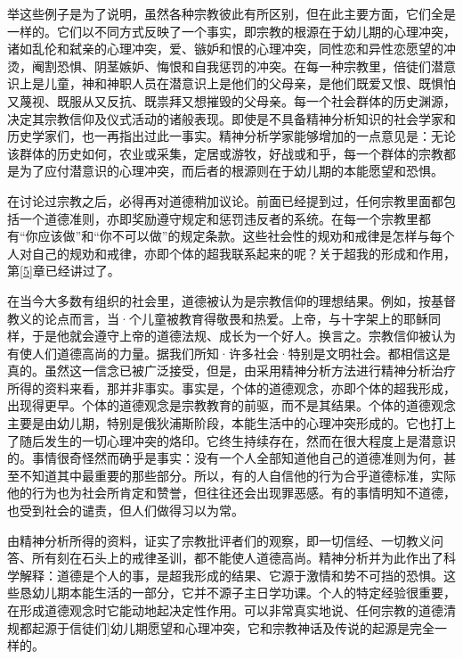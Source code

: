 \documentclass[UTF8,10pt,a4paper,openany]{book}
\begin{document}
举这些例子是为了说明，虽然各种宗教彼此有所区别，但在此主要方面，它们全是一样的。它们以不同方式反映了一个事实，即宗教的根源在于幼儿期的心理冲突，诸如乱伦和弑亲的心理冲突，爱、镞妒和恨的心理冲突，同性恋和异性恋愿望的冲烫，阉割恐惧、阴茎嫉妒、悔恨和自我惩罚的冲突。在每一种宗教里，倍徒们潜意识上是儿童，神和神职人员在潜意识上是他们的父母亲，是他们既爱又恨、既惧怕又蔑视、既服从又反抗、既祟拜又想摧毁的父母亲。每一个社会群体的历史渊源，决定其宗教信仰及仪式活动的诸般表现。即使是不具备精神分析知识的社会学家和历史学家们，也一再指出过此一事实。精神分析学家能够增加的一点意见是：无论该群体的历史如何，农业或采集，定居或游牧，好战或和乎，每一个群体的宗教都是为了应付潜意识的心理冲突，而后者的根源则在于幼儿期的本能愿望和恐惧。

在讨论过宗教之后，必得再对道德稍加议论。前面已经提到过，任何宗教里面都包括一个道德准则，亦即奖励遵守规定和惩罚违反者的系统。在每一个宗教里都有“你应该做”和“你不可以做”的规定条款。这些社会性的规劝和戒律是怎样与每个人对自己的规劝和戒律，亦即个体的超我联系起来的呢？关于超我的形成和作用，第\ref{5}章已经讲过了。

在当今大多数有组织的社会里，道德被认为是宗教信仰的理想结果。例如，按基督教义的论点而言，当·个儿童被教育得敬畏和热爱。上帝，与十字架上的耶稣同样，于是他就会遵守上帝的道德法规、成长为一个好人。换言之。宗教信仰被认为有使人们道德高尚的力量。据我们所知·许多社会·特别是文明社会。都相信这是真的。虽然这一信念已被广泛接受，但是，由采用精神分析方法进行精神分析治疗所得的资料来看，那并非事实。事实是，个体的道德观念，亦即个体的超我形成，出现得更早。个体的道德观念是宗教教育的前驱，而不是其结果。个体的道德观念主要是由幼儿期，特别是俄狄浦斯阶段，本能生活中的心理冲突形成的。它也打上了随后发生的一切心理冲突的烙印。它终生持续存在，然而在很大程度上是潜意识的。事情很奇怪然而确乎是事实：没有一个人全部知道他自己的道德准则为何，甚至不知道其中最重要的那些部分。所以，有的人自信他的行为合乎道德标准，实际他的行为也为社会所肯定和赞誉，但往往还会出现罪恶感。有的事情明知不道德，也受到社会的谴责，但人们做得习以为常。

由精神分析所得的资料，证实了宗教批评者们的观察，即一切信经、一切教义问答、所有刻在石头上的戒律圣训，都不能使人道德高尚。精神分析并为此作出了科学解释：道德是个人的事，是超我形成的结果、它源于激情和势不可挡的恐惧。这些恳幼儿期本能生活的一部分，它并不源子主日学功课。个人的特定经验很重要，在形成道德观念时它能动地起决定性作用。可以非常真实地说、任何宗教的道德清规都起源于信徒们]幼儿期愿望和心理冲突，它和宗教神话及传说的起源是完全一样的。
\end{document}
